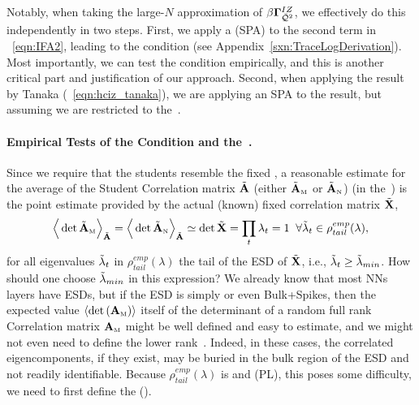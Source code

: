 Notably, when taking the large-$N$ approximation of $\beta\mathbf{\Gamma}^{IZ}_{\bar{\mathcal{Q}}^{2}}$, we effectively do this independently in two steps.
First, we apply a \SaddlePointApproximation (SPA) to the second term in \EQN~\ref{eqn:IFA2},
leading to the \TRACELOG condition (see Appendix~\ref{sxn:TraceLogDerivation}).
Most importantly, we can test the \TRACELOG condition empirically,
and this is another critical part and justification of our \SETOL approach.
Second, when applying the result by Tanaka (\EQN~\ref{eqn:hciz_tanaka}),
we are applying an SPA to the result, but assuming we are
restricted to the~\ECS.

\paragraph{Empirical Tests of the \TRACELOG Condition and the~\ECS.}

Since we require that the students resemble the fixed \Teacher, a reasonable estimate for the average of the Student
Correlation matrix $\tilde{\mathbf{A}}$
(either $\tilde{\mathbf{A}}_{\text{\tiny M}}$ or $\tilde{\mathbf{A}}_{\text{\tiny N}}$)  (in the~\ECS)  is the point estimate provided by the actual (known) fixed \Teacher correlation matrix $\tilde{\mathbf{X}}$, %
\begin{align} 
\label{eqn:IFA-ppint}
\Big\langle \det\tilde{\mathbf{A}}_{\text{\tiny M}}\Big\rangle_{\tilde{\mathbf{A}}}=
\Big\langle \det\tilde{\mathbf{A}}_{\text{\tiny N}}\Big\rangle_{\tilde{\mathbf{A}}}
\simeq\det\tilde{\mathbf{X}}=\prod_{t}\lambda_{t}=1\;\;\forall\tilde{\lambda}_{t}\in\rho^{emp}_{tail}(\lambda) ,
\end{align}
for all eigenvalues $\tilde{\lambda}_{t}$ in $\rho^{emp}_{tail}(\lambda)$ the tail of the
ESD of $\tilde{\mathbf{X}}$, i.e., $\tilde{\lambda}_{t}\ge{\tilde{\lambda}_{min}}$.
%
How should one choose ${\tilde{\lambda}_{min}}$ in this expression?
We already know that most NNs layers have \FatTailed ESDs, but
if the \Teacher ESD is simply \emph{\RandomLike} or even Bulk+Spikes, then the expected value
$\langle\mbox{}{\text{det}}\left({\mathbf{A}}_{\text{\tiny M}}\right)\rangle$ itself of the determinant
of a random full rank \Student Correlation matrix ${\mathbf{A}}_{\text{\tiny M}}$
might be well defined and easy to estimate, and we might not even need to define the lower rank~\ECS.
Indeed, in these cases, the correlated eigencomponents, if they exist, may be buried in the bulk
region of the ESD and not readily identifiable.
Because $\rho_{tail}^{emp}(\lambda)$ is \FatTailed
and \PowerLaw (PL), this poses some difficulty, we need to first define the \EffectiveCorrelationSpace (\ECS).


